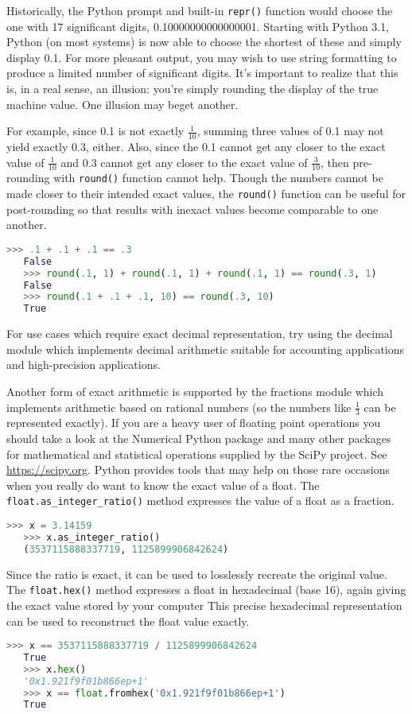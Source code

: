Historically, the Python prompt and built-in \lstinline|repr()| function would choose the one with 17 significant digits, 0.10000000000000001.
Starting with Python 3.1, Python (on most systems) is now able to choose the shortest of these and simply display 0.1.
For more pleasant output, you may wish to use string formatting to produce a limited number of significant digits.
It’s important to realize that this is, in a real sense, an illusion: you’re simply rounding the display of the true machine value.
One illusion may beget another.

For example, since 0.1 is not exactly \(\frac{1}{10}\), summing three values of 0.1 may not yield exactly 0.3, either.
Also, since the 0.1 cannot get any closer to the exact value of \(\frac{1}{10}\) and 0.3 cannot get any closer to the exact value of \(\frac{3}{10}\), then pre-rounding with \lstinline|round()| function cannot help.
Though the numbers cannot be made closer to their intended exact values, the \lstinline|round()| function can be useful for post-rounding so that results with inexact values become comparable to one another.
\begin{lstlisting}[language=Python]
   >>> .1 + .1 + .1 == .3
   False
   >>> round(.1, 1) + round(.1, 1) + round(.1, 1) == round(.3, 1)
   False
   >>> round(.1 + .1 + .1, 10) == round(.3, 10)
   True\end{lstlisting}
For use cases which require exact decimal representation, try using the decimal module which implements decimal arithmetic suitable for accounting applications and high-precision applications.

Another form of exact arithmetic is supported by the fractions module which implements arithmetic based on rational numbers (so the numbers like \(\frac{1}{3}\) can be represented exactly).
If you are a heavy user of floating point operations you should take a look at the Numerical Python package and many other packages for mathematical and statistical operations supplied by the SciPy project. See \url{https://scipy.org}.
Python provides tools that may help on those rare occasions when you really do want to know the exact value of a float.
The \lstinline|float.as_integer_ratio()| method expresses the value of a float as a fraction.
\begin{lstlisting}[language=Python]
   >>> x = 3.14159
   >>> x.as_integer_ratio()
   (3537115888337719, 1125899906842624)\end{lstlisting}

Since the ratio is exact, it can be used to losslessly recreate the original value.
The \lstinline|float.hex()| method expresses a float in hexadecimal (base 16), again giving the exact value stored by your computer
This precise hexadecimal representation can be used to reconstruct the float value exactly.
\begin{lstlisting}[language=Python]
   >>> x == 3537115888337719 / 1125899906842624
   True
   >>> x.hex()
   '0x1.921f9f01b866ep+1'
   >>> x == float.fromhex('0x1.921f9f01b866ep+1')
   True\end{lstlisting}

